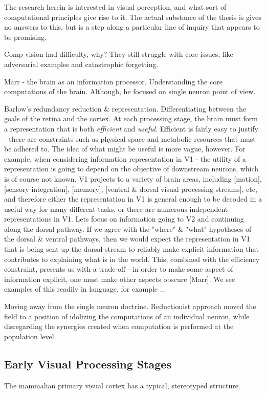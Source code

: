 The research herein is interested in visual perception, and what sort of computational principles give rise to it. The actual substance of the thesis is gives no answers to this, but is a step along a particular line of inquiry that appears to be promising.

Comp vision had difficulty, why? They still struggle with core issues, like adversarial examples and catastrophic forgetting.

Marr - the brain as an information processor. Understanding the core computations of the brain. Although, he focused on single neuron point of view.

Barlow's redundancy reduction \& representation. Differentiating between the goals of the retina and the cortex. At each processing stage, the brain must form a representation that is both \textit{efficient} and \textit{useful}. Efficient is fairly easy to justify - there are constraints such as physical space and metabolic resources that must be adhered to. The idea of what might be useful is more vague, however. For example, when considering information representation in V1 - the utility of a representation is going to depend on the objective of downstream neurons, which is of course not known. V1 projects to a variety of brain areas, including [motion], [sensory integration], [memory], [ventral \& dorsal visual processing streams], etc, and therefore either the representation in V1 is general enough to be decoded in a useful way for many different tasks, or there are numerous independent representations in V1. Lets focus on information going to V2 and continuing along the dorsal pathway. If we agree with the "where" \& "what" hypotheses of the dorsal \& ventral pathways, then we would expect the representation in V1 that is being sent up the dorsal stream to reliably make explicit information that contributes to explaining what is in the world. This, combined with the efficiency constraint, presents us with a trade-off - in order to make some aspect of information explicit, one must make other aspects obscure [Marr]. We see examples of this readily in language, for example ...

Moving away from the single neuron doctrine. Reductionist approach moved the field to a position of idolizing the computations of an individual neuron, while disregarding the synergies created when computation is performed at the population level.

\subsection{Early Visual Processing Stages}
The mammalian primary visual cortex has a typical, stereotyped structure. 

